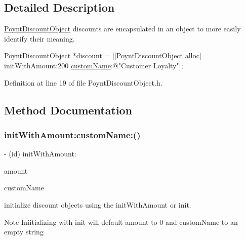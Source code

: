 \subsection{Detailed Description}
\hyperlink{interface_poynt_discount_object}{Poynt\+Discount\+Object}  discounts are encapsulated in an object to more easily identify their meaning.


\begin{DoxyCode}
\hyperlink{interface_poynt_discount_object}{PoyntDiscountObject} *discount  = [[\hyperlink{interface_poynt_discount_object}{PoyntDiscountObject} alloc] 
      initWithAmount:200 \hyperlink{interface_poynt_discount_object_ae38352d9ec7d2d1f03df4d4646c1a641}{customName}:\textcolor{stringliteral}{@"Customer Loyalty"}];
\end{DoxyCode}
 

Definition at line 19 of file Poynt\+Discount\+Object.\+h.



\subsection{Method Documentation}
\hypertarget{interface_poynt_discount_object_aca2778db881b6bf8745ee57b1d4e7639}{}\label{interface_poynt_discount_object_aca2778db881b6bf8745ee57b1d4e7639} 
\subsubsection{\texorpdfstring{init\+With\+Amount\+:custom\+Name\+:()}{initWithAmount:customName:()}}
{\footnotesize\ttfamily -\/ (id) init\+With\+Amount\+: \begin{DoxyParamCaption}\item[{(N\+S\+Integer)}]{amount }\item[{customName:(N\+S\+String $\ast$)}]{custom\+Name }\end{DoxyParamCaption}}



initialize discount objects using the init\+With\+Amount or init. 

\begin{DoxyNote}{Note}
Iniitializing with init will default amount to 0 and custom\+Name to an empty string 
\end{DoxyNote}


